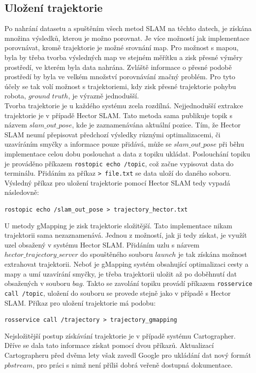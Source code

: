 \documentclass[12pt]{report}
\begin{document}
\subsection{Uložení trajektorie} \label{sekce:ulozeni_trajektorie}
Po nahrání datasetu a spuštěním všech metod SLAM na těchto datech, je získána množina výsledků, kterou je možno porovnat. Je více možností jak implementace porovnávat, kromě trajektorie je možné srovnání map. Pro možnost s mapou, byla by třeba tvorba výsledných map ve stejném měřítku a zisk přesné výměry prostředí, ve kterém byla data nahrána. Zvláště informace o přesné podobě prostředí by byla ve velkém množství porovnávání značný problém. Pro tyto účely se tak volí možnost s trajektoriemi, kdy zisk přesné trajektorie pohybu robota, $ground$ $truth$, je výrazně jednodušší.\\
\indent Tvorba trajektorie je u každého systému zcela rozdílná. Nejjednodušší extrakce trajektorie je v případě Hector SLAM. Tato metoda sama publikuje topik s názvem $slam\_out\_pose$, kde je zaznamenávána aktuální pozice. Tím, že Hector SLAM neumí přepisovat předchozí výsledky různými optimalizacemi, či uzavíráním smyčky a informace pouze přidává, může se $slam\_out\_pose$ při běhu implementace celou dobu poslouchat a data z topiku ukládat. Poslouchání topiku je prováděno příkazem \texttt{rostopic echo /topic}, což začne vypisovat data do terminálu. Přidáním za příkaz \texttt{> file.txt} se data uloží do daného soboru. Výsledný příkaz pro uložení trajektorie pomocí Hector SLAM tedy vypadá následovně:
\begin{center}
	\texttt{rostopic echo /slam\_out\_pose > trajectory\_hector.txt}
\end{center}
U metody gMapping je zisk trajektorie složitější. Tato implementace nikam trajektorii sama nezaznamenává. Jednou z možností, jak ji tedy získat, je využít uzel obsažený v systému Hector SLAM. Přidáním uzlu s názvem $hector\_trajectory\_server$ do spouštěného souboru $launch$ je tak získána možnost extrahovat trajektorii. Neboť je gMapping systém obsahující optimalizaci cesty a mapy a umí uzavírání smyčky, je třeba trajektorii uložit až po doběhnutí dat obsažených v souboru $bag$. Takto se zavolání topiku provádí příkazem \texttt{rosservice call /topic}, uložení do souboru se provede stejně jako v případě s Hector SLAM. Příkaz pro uložení trajektorie má podobu:
\begin{center}
	\texttt{rosservice call /trajectory > trajectory\_gmapping}
\end{center}
Nejsložitější postup získávání trajektorie je v případě systému Cartographer. Dříve se dala tato informace získat pomocí dvou příkazů. Aktualizací Cartographeru před dvěma lety však zavedl Google pro ukládání dat nový formát $pbstream$, pro práci s nimž není příliš dobrá veřeně dostupná dokumentace. 
\end{document}

